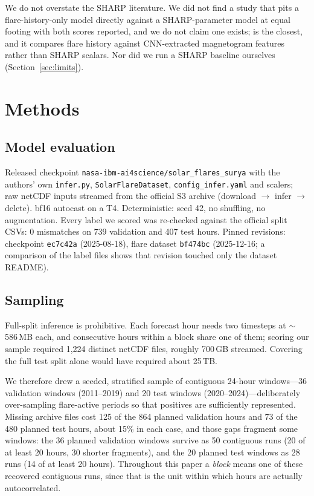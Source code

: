 \documentclass[11pt]{article}
\newcommand{\code}[1]{\texttt{#1}}
\begin{document}
We do not overstate the SHARP literature. We did not find a study
that pits a flare-history-only model directly against a SHARP-parameter model at
equal footing with both scores reported, and we do not claim one exists;
\citet{vandersande2023} is the closest, and it compares flare history against
CNN-extracted magnetogram features rather than SHARP scalars. Nor did we run a
SHARP baseline ourselves (Section~\ref{sec:limits}).

\section{Methods}

\subsection{Model evaluation}

Released checkpoint \code{nasa-ibm-ai4science/solar\_flares\_surya} with the
authors' own \code{infer.py}, \code{SolarFlareDataset}, \code{config\_infer.yaml}
and scalers; raw netCDF inputs streamed from the official S3 archive (download
$\rightarrow$ infer $\rightarrow$ delete). bf16 autocast on a T4. Deterministic:
seed 42, no shuffling, no augmentation. Every label we scored was re-checked
against the official split CSVs: 0 mismatches on 739 validation and 407 test
hours. Pinned revisions: checkpoint \code{ec7c42a} (2025-08-18), flare dataset
\code{bf474bc} (2025-12-16; a comparison of the label files shows that revision
touched only the dataset README).

\subsection{Sampling}
\label{sec:sampling}

Full-split inference is prohibitive. Each forecast hour needs two timesteps at
$\sim$586\,MB each, and consecutive hours within a block share one of them;
scoring our sample required 1{,}224 distinct netCDF files, roughly 700\,GB
streamed. Covering the full test split alone would have required about 25\,TB.

We therefore drew a seeded, stratified sample of contiguous 24-hour windows---36
validation windows (2011--2019) and 20 test windows (2020--2024)---deliberately
over-sampling flare-active periods so that positives are sufficiently
represented. Missing archive files cost 125 of the 864 planned validation hours
and 73 of the 480 planned test hours, about 15\% in each case, and those gaps
fragment some windows: the 36 planned validation windows survive as 50 contiguous
runs (20 of at least 20 hours, 30 shorter fragments), and the 20 planned test
windows as 28 runs (14 of at least 20 hours). Throughout this paper a
\emph{block} means one of these recovered contiguous runs, since that is the unit
within which hours are actually autocorrelated.
\end{document}
